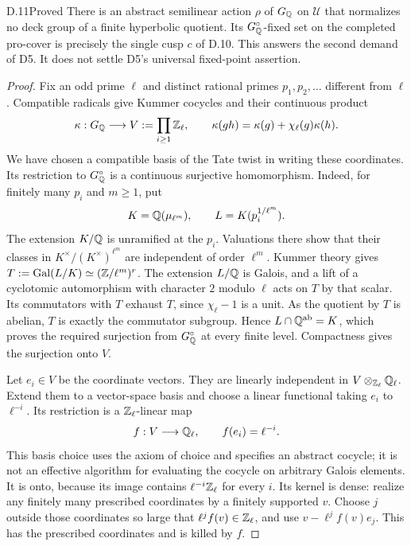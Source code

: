 \begin{claim}{D.11}{Proved}
There is an abstract semilinear action $\rho$ of $G_\mathbb Q$ on
$\mathcal U$ that normalizes no deck group of a finite
hyperbolic quotient. Its $G_\mathbb Q^\circ$-fixed set on the
completed pro-cover is precisely the single cusp $c$ of D.10.
This answers the second demand of D5. It does not settle
D5's universal fixed-point assertion.
\end{claim}
\begin{proof}
Fix an odd prime $\ell$ and distinct rational primes
$p_1,p_2,\ldots$ different from $\ell$. Compatible radicals
give Kummer cocycles and their continuous product
\[
 \kappa:G_\mathbb Q\longrightarrow V:=\prod_{i\ge1}\mathbb Z_\ell,
 \qquad
 \kappa(gh)=\kappa(g)+\chi_\ell(g)\kappa(h).
\]
We have chosen a compatible basis of the Tate twist in
writing these coordinates. Its restriction to $G_\mathbb Q^\circ$
is a continuous surjective homomorphism. Indeed, for finitely
many $p_i$ and $m\ge1$, put
\[
 K=\mathbb Q(\mu_{\ell^m}),\qquad
 L=K(p_i^{1/\ell^m}).
\]
The extension $K/\mathbb Q$ is unramified at the $p_i$.
Valuations there show that their classes in
$K^\times/(K^\times)^{\ell^m}$ are independent of order
$\ell^m$. Kummer theory gives
$T:=\operatorname{Gal}(L/K)\simeq(\mathbb Z/\ell^m)^r$.
The extension $L/\mathbb Q$ is Galois, and a lift of a cyclotomic
automorphism with character $2$ modulo $\ell$ acts on $T$
by that scalar. Its commutators with $T$ exhaust $T$, since
$\chi_\ell-1$ is a unit. As the quotient by $T$ is abelian,
$T$ is exactly the commutator subgroup. Hence
$L\cap\mathbb Q^{\mathrm{ab}}=K$, which proves the required
surjection from $G_\mathbb Q^\circ$ at every finite level.
Compactness gives the surjection onto $V$.

Let $e_i\in V$ be the coordinate vectors. They are linearly
independent in $V\otimes_{\mathbb Z_\ell}\mathbb Q_\ell$. Extend them to
a vector-space basis and choose a linear functional taking
$e_i$ to $\ell^{-i}$. Its restriction is a
$\mathbb Z_\ell$-linear map
\[
             f:V\longrightarrow\mathbb Q_\ell,
                   \qquad f(e_i)=\ell^{-i}.
\]
This basis choice uses the axiom of choice and specifies an
abstract cocycle; it is not an effective algorithm for
evaluating the cocycle on arbitrary Galois elements.
It is onto, because its image contains
$\ell^{-i}\mathbb Z_\ell$ for every $i$. Its kernel is dense:
realize any finitely many prescribed coordinates by a
finitely supported $v$. Choose $j$ outside those coordinates
so large that $\ell^j f(v)\in\mathbb Z_\ell$, and use
$v-\ell^j f(v)e_j$. This has the prescribed coordinates
and is killed by $f$.


\end{proof}
